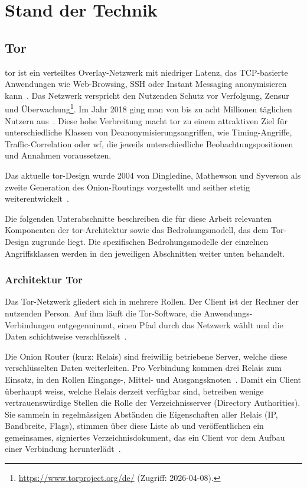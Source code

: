 \chapter{Stand der Technik}
\label{cha:stand_der_technik}

\section{Tor}

\gls{tor} ist ein verteiltes Overlay-Netzwerk mit niedriger Latenz, das TCP-basierte Anwendungen wie Web-Browsing, SSH oder Instant Messaging anonymisieren kann~\cite{dingledine2004tor}.
Das Netzwerk verspricht den Nutzenden Schutz vor Verfolgung, Zensur und Überwachung\footnote{\url{https://www.torproject.org/de/} (Zugriff: 2026-04-08).}. Im Jahr 2018 ging man von bis zu acht Millionen täglichen Nutzern aus~\cite{mani2018understanding}.
Diese hohe Verbreitung macht \gls{tor} zu einem attraktiven Ziel für unterschiedliche Klassen von Deanonymisierungsangriffen, wie Timing-Angriffe, Traffic-Correlation oder \gls{wf}, die jeweils unterschiedliche Beobachtungspositionen und Annahmen voraussetzen.

Das aktuelle \gls{tor}-Design wurde 2004 von Dingledine, Mathewson und Syverson als zweite Generation des Onion-Routings vorgestellt und seither stetig weiterentwickelt~\cite{dingledine2004tor}.

Die folgenden Unterabschnitte beschreiben die für diese Arbeit relevanten Komponenten der \gls{tor}-Architektur sowie das Bedrohungsmodell, das dem Tor-Design zugrunde liegt. Die spezifischen Bedrohungsmodelle der einzelnen Angriffsklassen werden in den jeweiligen Abschnitten weiter unten behandelt.

\subsection{Architektur Tor}

Das Tor-Netzwerk gliedert sich in mehrere Rollen.
Der Client ist der Rechner der nutzenden Person. Auf ihm läuft die Tor-Software, die Anwendungs-Verbindungen entgegennimmt, einen Pfad durch das Netzwerk wählt und die Daten schichtweise verschlüsselt~\cite{dingledine2004tor}.

Die Onion Router (kurz: Relais) sind freiwillig betriebene Server, welche diese verschlüsselten Daten weiterleiten.
Pro Verbindung kommen drei Relais zum Einsatz, in den Rollen Eingangs-, Mittel- und Ausgangsknoten~\cite{torspec_intro}.
Damit ein Client überhaupt weiss, welche Relais derzeit verfügbar sind, betreiben wenige vertrauenswürdige Stellen die Rolle der Verzeichnisserver (Directory Authorities).
Sie sammeln in regelmässigen Abständen die Eigenschaften aller Relais (IP, Bandbreite, Flags), stimmen über diese Liste ab und veröffentlichen ein gemeinsames, signiertes Verzeichnisdokument, das ein Client vor dem Aufbau einer Verbindung herunterlädt~\cite{torspec_dirspec}.

